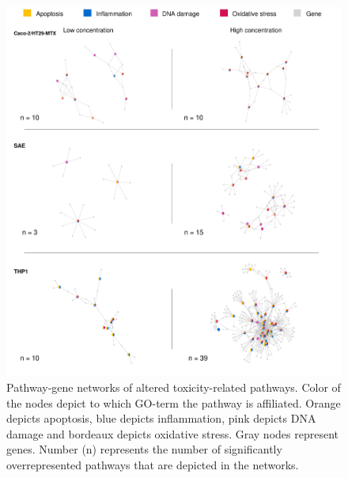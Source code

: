 \documentclass[ijms,article,submit,moreauthors,pdftex]{Definitions/mdpi}
\begin{document}
\begin{figure}[ht!]
\includegraphics[width=0.9\linewidth]{fig2.pdf}
  \caption{Pathway-gene networks of altered toxicity-related pathways.
   Color of the nodes depict to which GO-term the pathway is affiliated. Orange depicts apoptosis, blue depicts inflammation, pink depicts DNA damage and bordeaux depicts oxidative stress. Gray nodes represent genes. Number (n) represents the number of significantly overrepresented pathways that are depicted in the networks.}
\label{fig:fig2}
\end{figure}
\end{document}
